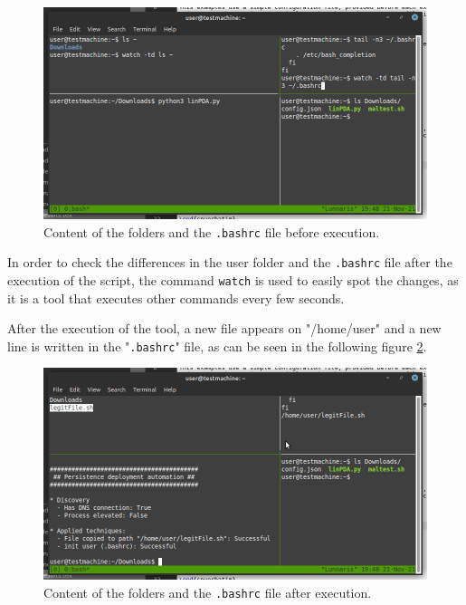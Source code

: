 \begin{figure}[!ht]
	\centering
	\includegraphics[width=14cm,trim={0.5cm 1cm 0.5cm 0.5cm},clip]{img/linPDA-before}
	\caption{Content of the folders and the \texttt{.bashrc} file before execution.}
	\label{img:linpdaBefore}
\end{figure}

In order to check the differences in the user folder and the \texttt{.bashrc} file after the execution of the script, the command \texttt{watch} is used to easily spot the changes, as it is a tool that executes other commands every few seconds.

\pagebreak
After the execution of the tool, a new file appears on "/home/user" and a new line is written in the "\texttt{.bashrc}" file, as can be seen in the following figure \ref{img:linpdaAfter}.

\begin{figure}[!ht]
	\centering
	\includegraphics[width=14cm,trim={0.5cm 1cm 0.5cm 0.5cm},clip]{img/linPDA-after}
	\caption{Content of the folders and the \texttt{.bashrc} file after execution.}
	\label{img:linpdaAfter}
\end{figure}

